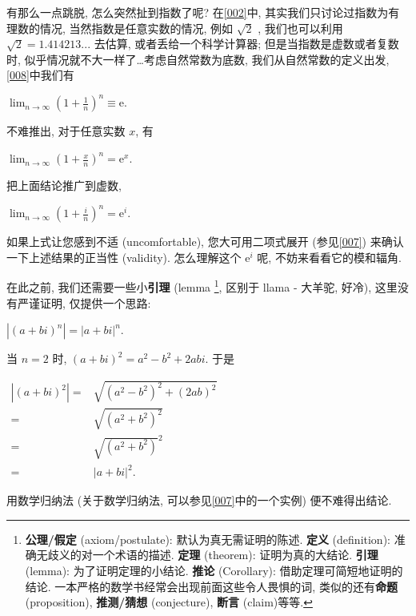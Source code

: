 \begin{tcolorbox}[size=fbox, breakable, enhanced jigsaw, title={复数的指数形式}]

有那么一点跳脱, 怎么突然扯到指数了呢? 在\ref{002}中,
其实我们只讨论过指数为有理数的情况, 当然指数是任意实数的情况, 例如
$\sqrt{2}$ , 我们也可以利用 $\sqrt{2}=1.414213...$ 去估算,
或者丢给一个科学计算器; 但是当指数是虚数或者复数时,
似乎情况就不大一样了\ldots 考虑自然常数为底数, 我们从自然常数的定义出发,
\ref{008}中我们有

$\lim_{n\rightarrow\infty}\left(1+\frac{1}{n}\right)^n\equiv\mathrm{e}.$

不难推出, 对于任意实数 $x$, 有

$\lim_{n\rightarrow\infty}\left(1+\frac{x}{n}\right)^n=\mathrm{e}^x.$

把上面结论推广到虚数,

$\lim_{n\rightarrow\infty}\left(1+\frac{i}{n}\right)^n=\mathrm{e}^i.$

如果上式让您感到不适 (uncomfortable), 您大可用二项式展开 (参见\ref{007})
来确认一下上述结果的正当性 (validity). 怎么理解这个 $\mathrm{e}^i$ 呢,
不妨来看看它的模和辐角.

在此之前, 我们还需要一些小\textbf{引理} (lemma \footnote{\textbf{公理/假定}
  (axiom/postulate): 默认为真无需证明的陈述. \textbf{定义} (definition):
  准确无歧义的对一个术语的描述. \textbf{定理} (theorem):
  证明为真的大结论. \textbf{引理} (lemma): 为了证明定理的小结论.
  \textbf{推论} (Corollary): 借助定理可简短地证明的结论.
  一本严格的数学书经常会出现前面这些令人畏惧的词,
  类似的还有\textbf{命题} (proposition), \textbf{推测/猜想}
  (conjecture), \textbf{断言} (claim)等等.}, 区别于 llama - 大羊驼,
好冷), 这里没有严谨证明, 仅提供一个思路:

\begin{tcolorbox}[size=fbox, breakable, enhanced jigsaw, title={引理1}]
$\boxed{|(a+bi)^n|=|a+bi|^n}$.
\end{tcolorbox}

\begin{newquote}
当 $n=2$ 时, $(a+bi)^2=a^2-b^2+2abi$. 于是

$\begin{aligned}|(a+bi)^2|=&\sqrt{(a^2-b^2)^2+(2ab)^2}\\=&\sqrt{(a^2+b^2)^2}\\=&\sqrt{(a^2+b^2)}^2\\=&|a+bi|^2.\end{aligned}$

用数学归纳法 (关于数学归纳法, 可以参见\ref{007}中的一个实例)
便不难得出结论.
\end{newquote}


\end{tcolorbox}
